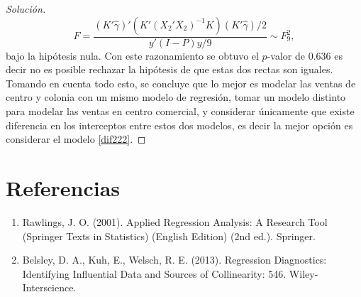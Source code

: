 \documentclass[10.5pt,notitlepage]{article}
\newenvironment{solucion}
  {\begin{proof}[Solución]}
  {\end{proof}}
\theoremstyle{plain}
\begin{document}
\begin{solucion}
\[
F = \frac{(K'\hat{\gamma})'(K'(X_2'X_2)^{-1}K)(K' \hat{\gamma})/2}{y'(I - P)y/9} \sim F_{9}^{2},
\]
bajo la hipótesis nula. Con este razonamiento se obtuvo el \(p\)-valor de \(0.636\) es decir no es posible rechazar la hipótesis de que estas dos rectas son iguales. Tomando en cuenta todo esto, se concluye que lo mejor es modelar las ventas de centro y colonia con un mismo modelo de regresión, tomar un modelo distinto para modelar las ventas en centro comercial, y considerar únicamente que existe diferencia en los interceptos entre estos dos modelos, es decir la mejor opción es considerar el modelo \eqref{dif222}.   
\end{solucion}

\newpage
\section{Referencias}
\begin{enumerate}
    \item Rawlings, J. O. (2001). Applied Regression Analysis: A Research Tool (Springer Texts in Statistics) (English Edition) (2nd ed.). Springer.
    \item Belsley, D. A., Kuh, E., Welsch, R. E. (2013). Regression Diagnostics: Identifying Influential Data and Sources of Collinearity: 546. Wiley-Interscience.
\end{enumerate}
\end{document}
